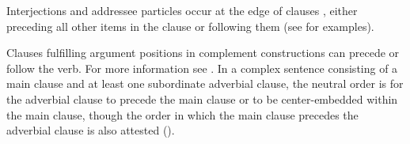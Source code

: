 Interjections and addressee particles occur at the edge of clauses , either preceding all other items in the clause or following them (see  for examples).

Clauses fulfilling argument positions in complement constructions can precede or follow the verb. For more information see . In a complex sentence consisting of a main clause and at least one subordinate adverbial clause, the neutral order is for the adverbial clause to precede the main clause or to be center-embedded within the main clause, though the order in which the main clause precedes the adverbial clause is also attested ().

